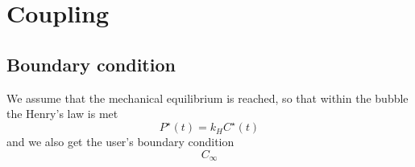 \documentclass[11pt]{revtex4}
\begin{document}

\section{Coupling}
\subsection{Boundary condition}
We assume that the mechanical equilibrium is reached, so that within the bubble the Henry's law is met
\begin{equation}
	P^\star(t) = k_H C^\star(t)
\end{equation}
and we also get the user's boundary condition
\begin{equation}
	C_\infty
\end{equation}
\end{document}
